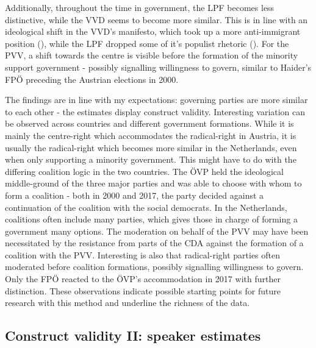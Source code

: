 \documentclass{article}
\begin{document}
Additionally, throughout the time in government, the LPF becomes less distinctive, while the VVD seems to become more similar. This is in line with an ideological shift in the VVD's manifesto, which took up a more anti-immigrant position (\cite{Pennings2003}), while the LPF dropped some of it's populist rhetoric (\cite{Lucardie2007LPF}). For the PVV, a shift towards the centre is visible before the formation of the minority support government - possibly signalling willingness to govern, similar to Haider's FPÖ preceding the Austrian elections in 2000.\par

The findings are in line with my expectations: governing parties are more similar to each other - the estimates display construct validity. Interesting variation can be observed across countries and different government formations. While it is mainly the centre-right which accommodates the radical-right in Austria, it is usually the radical-right which becomes more similar in the Netherlands, even when only supporting a minority government. This might have to do with the differing coalition logic in the two countries. The ÖVP held the ideological middle-ground of the three major parties and was able to choose with whom to form a coalition - both in 2000 and 2017, the party decided against a continuation of the coalition with the social democrats. In the Netherlands, coalitions often include many parties, which gives those in charge of forming a government many options. The moderation on behalf of the PVV may have been necessitated by the resistance from parts of the CDA against the formation of a coalition with the PVV. Interesting is also that radical-right parties often moderated before coalition formations, possibly signalling willingness to govern. Only the FPÖ reacted to the ÖVP's accommodation in 2017 with further distinction. These observations indicate possible starting points for future research with this method and underline the richness of the data.\par



\subsection{Construct validity II: speaker estimates}
\end{document}
